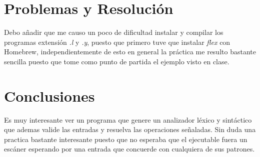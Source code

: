 \section{Problemas y Resolución}

Debo añadir que me causo un poco de dificultad instalar y compilar los programas extensión \textit{.l} y \textit{.y}, puesto que primero tuve que instalar \textit{flex} con Homebrew, independientemente de esto en general la práctica me resulto bastante sencilla puesto que tome como punto de partida el ejemplo visto en clase.

\section{Conclusiones}

Es muy interesante ver un programa que genere un analizador léxico y sintáctico que ademas valide las entradas y resuelva las operaciones señaladas. Sin duda una practica bastante interesante puesto que no esperaba que el ejecutable fuera un escáner esperando por una entrada que concuerde con cualquiera de sus patrones.

\pagebreak